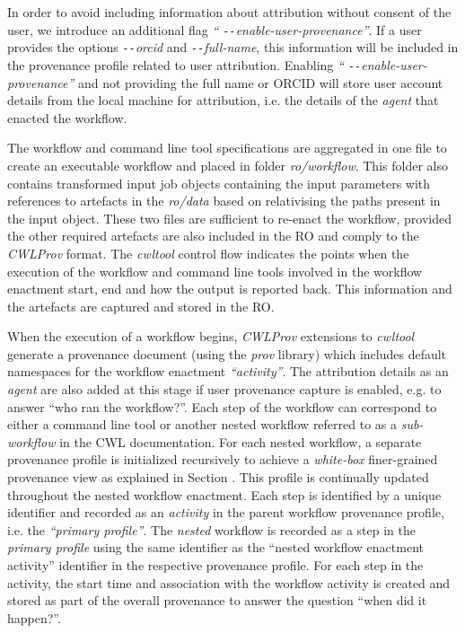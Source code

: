 \documentclass[a4paper,num-refs]{oup-contemporary}
\begin{document}
In order to avoid including information about attribution without consent of the user, we introduce an additional flag \textit{`` \texttt{-{}-}enable-user-provenance''}. If a user provides the options \textit{ \texttt{-{}-}orcid} and \textit{ \texttt{-{}-}full-name}, this information will be included in the provenance profile related to user attribution. Enabling \textit{`` \texttt{-{}-}enable-user-provenance''} and not providing the full name or ORCID will store user account details from the local machine for attribution, i.e. the details of the \textit{agent} that enacted the workflow. 

The workflow and command line tool specifications are aggregated in one file to create an executable workflow and placed in folder \textit{ro/workflow}. This folder also contains transformed input job objects containing the input parameters with references to artefacts in the \textit{ro/data} based on relativising the paths present in the input object. These two files are sufficient to re-enact the workflow, provided the other required artefacts are also included in the RO and comply to the \textit{CWLProv} format. The \textit{cwltool} control flow \citep{cwltool-controlflow} indicates the points when the execution of the workflow and command line tools involved in the workflow enactment start, end and how the output is reported back. This information and the artefacts are captured and stored in the RO.

When the execution of a workflow begins, \textit{CWLProv} extensions to \textit{cwltool} generate a provenance document (using the \textit{prov} library) which includes default namespaces for the workflow enactment \textit{“activity”}. The attribution details as an \textit{agent} are also added at this stage if user provenance capture is enabled, e.g. to answer ``who ran the workflow?''. Each step of the workflow can correspond to either a command line tool or another nested workflow referred to as a \textit{sub-workflow} in the CWL documentation. For each nested workflow, a separate provenance profile is initialized recursively to achieve a \textit{white-box} finer-grained provenance view as explained in Section \textbf{}. This profile is continually updated throughout the nested workflow enactment. Each step is identified by a unique identifier and recorded as an \textit{activity} in the parent workflow provenance profile, i.e. the \textit{``primary profile''}. The \textit{nested} workflow is recorded as a step in the \textit{primary profile} using the same identifier as the ``nested workflow enactment activity'' identifier in the respective provenance profile. For each step in the activity, the start time and association with the workflow activity is created and stored as part of the overall provenance to answer the question ``when did it happen?''. 
\end{document}
